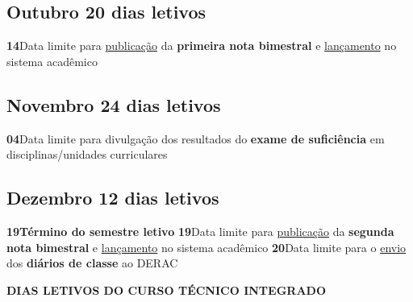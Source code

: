 \documentclass[thesis]{hmcposter}
\begin{document}
\begin{poster}
\subsection{Outubro \hfill 20 dias letivos}\textbf{14}\qquad Data limite para \underline{publicação} da \textbf{primeira nota bimestral} e \underline{lançamento} no sistema acadêmico \newline \null\subsection{Novembro \hfill 24 dias letivos}\textbf{04}\qquad Data limite para divulgação dos resultados do \textbf{exame de suficiência} em disciplinas/unidades curriculares \newline \null\subsection{Dezembro \hfill 12 dias letivos}\textbf{19}\qquad \textbf{Término do semestre letivo} \newline \null\textbf{19}\qquad Data limite para \underline{publicação} da \textbf{segunda nota bimestral} e \underline{lançamento} no sistema acadêmico \newline \null\textbf{20}\qquad Data limite para o \underline{envio} dos \textbf{diários de classe} ao DERAC \newline \null\newpage
~
\vfill
\begin{center}
\large \textbf{DIAS LETIVOS DO CURSO TÉCNICO INTEGRADO}
\newline
\null
\newline
\begin{table}
\centering
{}
\end{table}
\newline
\null
\newline
\end{center}

\end{poster}
\end{document}
